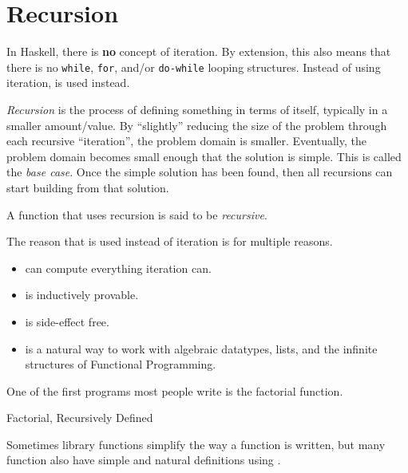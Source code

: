 \section{Recursion}\label{sec:Recursion}
In Haskell, there is \textbf{no} concept of iteration.
By extension, this also means that there is no \texttt{while}, \texttt{for}, and/or \texttt{do-while} looping structures.
Instead of using iteration,  is used instead.

\begin{definition}[Recursion]\label{def:Recursion}
  \emph{Recursion} is the process of defining something in terms of itself, typically in a smaller amount/value.
  By ``slightly'' reducing the size of the problem through each recursive ``iteration'', the problem domain is smaller.
  Eventually, the problem domain becomes small enough that the solution is simple.
  This is called the \emph{base case}.
  Once the simple solution has been found, then all recursions can start building from that solution.

  \begin{remark}[Recursive]\label{rmk:Recursive}
    A function that uses recursion is said to be \emph{recursive}.
  \end{remark}
\end{definition}

The reason that  is used instead of iteration is for multiple reasons.
\begin{itemize}[noitemsep]
\item {} can compute everything iteration can.
\item {} is inductively provable.
\item {} is side-effect free.
\item {} is a natural way to work with algebraic datatypes, lists, and the infinite structures of Functional Programming.
\end{itemize}

One of the first  programs most people write is the factorial function.
\begin{listing}[h!tbp]
\caption{Factorial, Recursively Defined}
\label{lst:Recursive_Factorial}
\end{listing}

Sometimes library functions simplify the way a function is written, but many function also have simple and natural definitions using .

